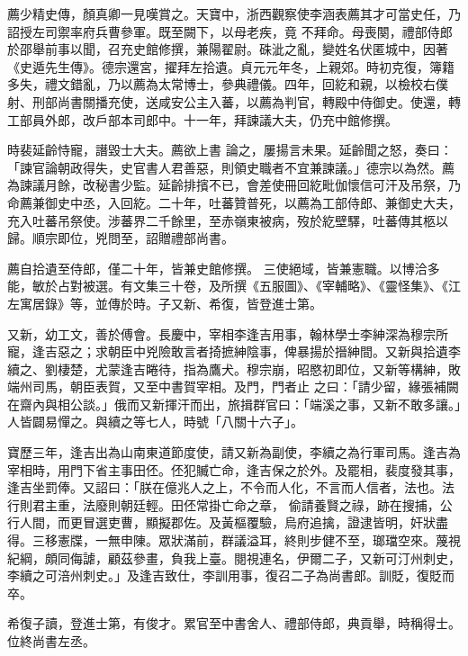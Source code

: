 \begin{pinyinscope}
 薦少精史傳，顏真卿一見嘆賞之。天寶中，浙西觀察使李涵表薦其才可當史任，乃詔授左司禦率府兵曹參軍。既至闕下，以母老疾，竟
 不拜命。母喪闋，禮部侍郎於邵舉前事以聞，召充史館修撰，兼陽翟尉。硃泚之亂，變姓名伏匿城中，因著《史遁先生傳》。德宗還宮，擢拜左拾遺。貞元元年冬，上親郊。時初克復，簿籍多失，禮文錯亂，乃以薦為太常博士，參典禮儀。四年，回紇和親，以檢校右僕射、刑部尚書關播充使，送咸安公主入蕃，以薦為判官，轉殿中侍御史。使還，轉工部員外郎，改戶部本司郎中。十一年，拜諫議大夫，仍充中館修撰。



 時裴延齡恃寵，譖毀士大夫。薦欲上書
 論之，屢揚言未果。延齡聞之怒，奏曰：「諫官論朝政得失，史官書人君善惡，則領史職者不宜兼諫議。」德宗以為然。薦為諫議月餘，改秘書少監。延齡排擯不已，會差使冊回紇毗伽懷信可汗及吊祭，乃命薦兼御史中丞，入回紇。二十年，吐蕃贊普死，以薦為工部侍郎、兼御史大夫，充入吐蕃吊祭使。涉蕃界二千餘里，至赤嶺東被病，歿於紇壁驛，吐蕃傳其柩以歸。順宗即位，兇問至，詔贈禮部尚書。



 薦自拾遺至侍郎，僅二十年，皆兼史館修撰。
 三使絕域，皆兼憲職。以博洽多能，敏於占對被選。有文集三十卷，及所撰《五服圖》、《宰輔略》、《靈怪集》、《江左寓居錄》等，並傳於時。子又新、希復，皆登進士第。



 又新，幼工文，善於傅會。長慶中，宰相李逢吉用事，翰林學士李紳深為穆宗所寵，逢吉惡之；求朝臣中兇險敢言者掎摭紳陰事，俾暴揚於搢紳間。又新與拾遺李續之、劉棲楚，尤蒙逢吉睠待，指為鷹犬。穆宗崩，昭愍初即位，又新等構紳，敗端州司馬，朝臣表賀，又至中書賀宰相。及門，門者止
 之曰：「請少留，緣張補闕在齋內與相公談。」俄而又新揮汗而出，旅揖群官曰：「端溪之事，又新不敢多讓。」人皆闢易憚之。與續之等七人，時號「八關十六子」。



 寶歷三年，逢吉出為山南東道節度使，請又新為副使，李續之為行軍司馬。逢吉為宰相時，用門下省主事田伾。伾犯贓亡命，逢吉保之於外。及罷相，裴度發其事，逢吉坐罰俸。又詔曰：「朕在億兆人之上，不令而人化，不言而人信者，法也。法行則君主重，法廢則朝廷輕。田伾常掛亡命之章，
 偷請養賢之祿，跡在搜捕，公行人間，而更冒選吏曹，顯擬郡佐。及黃樞覆驗，烏府追擒，證逮皆明，奸狀盡得。三移憲牒，一無申陳。眾狀滿前，群議溢耳，終則步健不至，瑯璫空來。蔑視紀綱，頗同侮謔，顧茲參畫，負我上臺。閱視連名，伊爾二子，又新可汀州刺史，李續之可涪州刺史。」及逢吉致仕，李訓用事，復召二子為尚書郎。訓貶，復貶而卒。



 希復子讀，登進士第，有俊才。累官至中書舍人、禮部侍郎，典貢舉，時稱得士。位終尚書左丞。




\end{pinyinscope}
